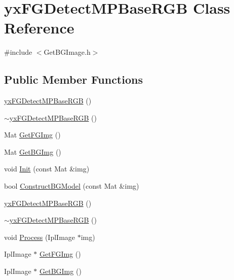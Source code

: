 \hypertarget{classyx_f_g_detect_m_p_base_r_g_b}{\section{yx\+F\+G\+Detect\+M\+P\+Base\+R\+G\+B Class Reference}
\label{classyx_f_g_detect_m_p_base_r_g_b}
}


{\ttfamily \#include $<$Get\+B\+G\+Image.\+h$>$}

\subsection*{Public Member Functions}
\begin{DoxyCompactItemize}
\item 
\hyperlink{classyx_f_g_detect_m_p_base_r_g_b_a8bd38d47d8d23bc8aadd322798cbef8f}{yx\+F\+G\+Detect\+M\+P\+Base\+R\+G\+B} ()
\item 
\hyperlink{classyx_f_g_detect_m_p_base_r_g_b_a2af7510b8c8af04115ba61321d76b2d3}{$\sim$yx\+F\+G\+Detect\+M\+P\+Base\+R\+G\+B} ()
\item 
Mat \hyperlink{classyx_f_g_detect_m_p_base_r_g_b_a422a0b7ab8ac98c8f67f2dbb10523951}{Get\+F\+G\+Img} ()
\item 
Mat \hyperlink{classyx_f_g_detect_m_p_base_r_g_b_a939dd958ba78e83e2f40ab3f10c0a368}{Get\+B\+G\+Img} ()
\item 
void \hyperlink{classyx_f_g_detect_m_p_base_r_g_b_ab60685bc9182c4cd596c3dfd548b5d3c}{Init} (const Mat \&img)
\item 
bool \hyperlink{classyx_f_g_detect_m_p_base_r_g_b_a259c98c561ebeb08fb88b217b8b0f82e}{Construct\+B\+G\+Model} (const Mat \&img)
\item 
\hyperlink{classyx_f_g_detect_m_p_base_r_g_b_a8bd38d47d8d23bc8aadd322798cbef8f}{yx\+F\+G\+Detect\+M\+P\+Base\+R\+G\+B} ()
\item 
\hyperlink{classyx_f_g_detect_m_p_base_r_g_b_a2af7510b8c8af04115ba61321d76b2d3}{$\sim$yx\+F\+G\+Detect\+M\+P\+Base\+R\+G\+B} ()
\item 
void \hyperlink{classyx_f_g_detect_m_p_base_r_g_b_aee22234d55ddf821d998ec324e01dbc3}{Process} (Ipl\+Image $\ast$img)
\item 
Ipl\+Image $\ast$ \hyperlink{classyx_f_g_detect_m_p_base_r_g_b_a4fc2aa38d8827fe576d8911b55fb4ff8}{Get\+F\+G\+Img} ()
\item 
Ipl\+Image $\ast$ \hyperlink{classyx_f_g_detect_m_p_base_r_g_b_aeab1766077df2121717326d14a9861a3}{Get\+B\+G\+Img} ()

\end{DoxyCompactItemize}
